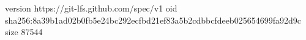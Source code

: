 version https://git-lfs.github.com/spec/v1
oid sha256:8a39b1ad02b0fb5e24bc292ecfbd21ef83a5b2cdbbcfdeeb025654699fa92d9c
size 87544
